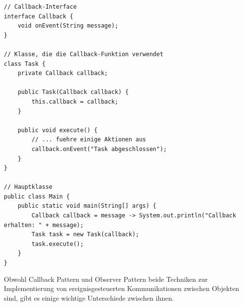 \noindent\begin{minipage}{\textwidth}
\begin{lstlisting}[caption={Callback Pattern},captionpos=b,label={lst:callback}]
// Callback-Interface
interface Callback {
    void onEvent(String message);
}

// Klasse, die die Callback-Funktion verwendet
class Task {
    private Callback callback;

    public Task(Callback callback) {
        this.callback = callback;
    }

    public void execute() {
        // ... fuehre einige Aktionen aus
        callback.onEvent("Task abgeschlossen");
    }
}

// Hauptklasse
public class Main {
    public static void main(String[] args) {
        Callback callback = message -> System.out.println("Callback erhalten: " + message);
        Task task = new Task(callback);
        task.execute();
    }
}
\end{lstlisting}
\end{minipage}
Obwohl Callback Pattern und Observer Pattern beide Techniken zur Implementierung von ereignisgesteuerten Kommunikationen zwischen Objekten sind, gibt es einige wichtige Unterschiede zwischen ihnen.

